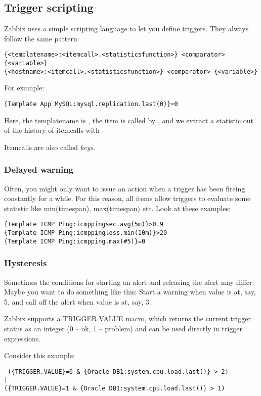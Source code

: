 \subsection{Trigger scripting}
Zabbix uses a simple scripting language to let you define triggers. They always follow the same pattern: 
\begin{lstlisting}
{<templatename>:<itemcall>.<statisticsfunction>} <comparator> {<variable>}
{<hostname>:<itemcall>.<statisticsfunction>} <comparator> {<variable>}
\end{lstlisting}

For example: 
\begin{lstlisting}
{Template App MySQL:mysql.replication.last(0)}=0
\end{lstlisting}

Here, the templatename is , the item is called by , and we extract a statistic out of the history of itemcalls with .

Itemcalls are also called \emph{keys}.

\subsubsection{Delayed warning}
Often, you might only want to issue an action when a trigger has been fireing constantly for a while. For this reason, all items allow triggers to evaluate some statistic like min(timespan), max(timespan) etc. Look at these examples: 
\begin{lstlisting}
{Template ICMP Ping:icmppingsec.avg(5m)}>0.9
{Template ICMP Ping:icmppingloss.min(10m)}>20
{Template ICMP Ping:icmpping.max(#5)}=0
\end{lstlisting}


\subsubsection{Hysteresis}
Sometimes the conditions for starting an alert and releasing the alert may differ. Maybe you want to do something like this: Start a warning when value is at, say, 5, and call off the alert when value is at, say, 3. 

Zabbix supports a {TRIGGER.VALUE} macro, which returns the current trigger status as an integer (0 – ok, 1 – problem) and can be used directly in trigger expressions.

 Consider this example: 
 \begin{lstlisting}
 ({TRIGGER.VALUE}=0 & {Oracle DB1:system.cpu.load.last()} > 2)
|
({TRIGGER.VALUE}=1 & {Oracle DB1:system.cpu.load.last()} > 1)
 \end{lstlisting}
 
